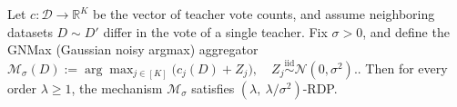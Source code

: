 Let $c:\mathcal{D}\to\mathbb{R}^K$ be the vector of teacher vote counts, and assume neighboring datasets $D\sim D'$ differ in the vote of a single teacher. Fix $\sigma>0$, and define the GNMax (Gaussian noisy argmax) aggregator $\mathcal{M}_\sigma(D):=\arg\max_{j\in[K]}\bigl(c_j(D)+Z_j), \quad Z_j \overset{\mathrm{iid}}{\sim}\mathcal{N}(0,\sigma^2).$. Then for every order $\lambda\ge 1$, the mechanism $\mathcal{M}_\sigma$ satisfies $(\lambda,\ \lambda/\sigma^2)$-RDP.